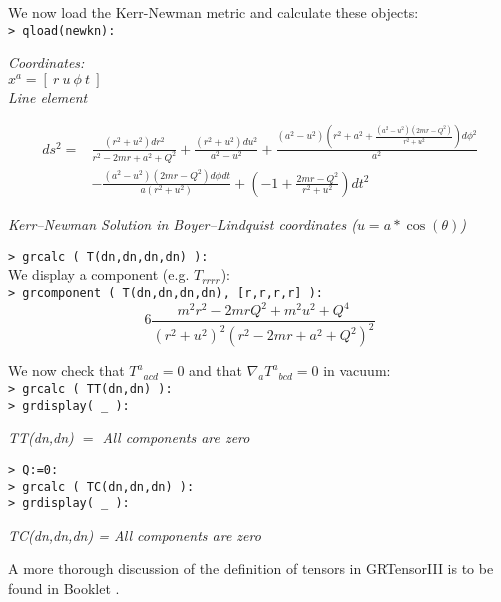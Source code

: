 \documentclass{article}
\begin{document}
{We now load the Kerr-Newman metric and calculate these objects:\\

\noindent\texttt{> qload(newkn):}
\begin{center}\textit{
  Coordinates:\\
  $x^a = [\ r\ u\ \phi\ t\ ]$\\
  Line element}
\end{center}
\begin{align*}
  ds^2 = & \frac{(r^2 + u^2)dr^2}{r^2 - 2mr + a^2 + Q^2}
    + \frac{(r^2 + u^2)du^2}{a^2 - u^2}
    + \frac{(a^2 - u^2)\left(r^2 + a^2 + \frac{(a^2 - u^2)
      (2mr-Q^2)}{r^2 + u^2}\right)d\phi^2}{a^2}\\
    & -\frac{(a^2-u^2)(2mr-Q^2)d\phi dt}{a(r^2+u^2)}
    + \left( -1 + \frac{2mr - Q^2}{r^2 + u^2}\right) dt^2
\end{align*}
\begin{center}
  \textit{Kerr--Newman Solution in Boyer--Lindquist coordinates 
  ($u=a\ast \cos(\theta)$)}\\
\end{center}

\noindent\texttt{> grcalc ( T(dn,dn,dn,dn) ):}\\

\noindent We display a component (e.g. $T_{rrrr}$):\\

\noindent\texttt{> grcomponent ( T(dn,dn,dn,dn), [r,r,r,r] ):}
\[
  6\frac{m^2 r^2 - 2mrQ^2 + m^2 u^2 + Q^4}
    {(r^2 + u^2)^2(r^2 - 2mr + a^2 + Q^2)^2}
\]

\noindent We now check that $T^a{}_{acd}=0$ and that 
$\nabla_a T^a{}_{bcd}=0$ in vacuum:\\

\noindent\texttt{> grcalc ( TT(dn,dn) ):}\\
\texttt{> grdisplay( \_ ):}
\begin{center}
  \textit{TT(dn,dn) $=$ All components are zero}
\end{center}
\texttt{> Q:=0:}\\
\texttt{> grcalc ( TC(dn,dn,dn) ):}\\
\texttt{> grdisplay( \_ ):}
\begin{center}
  \textit{TC(dn,dn,dn) = All components are zero}
\end{center}

A more thorough discussion of the definition of tensors in GRTensorIII is
to be found in Booklet \grDefRef.
%
\pagebreak
}
\end{document}
